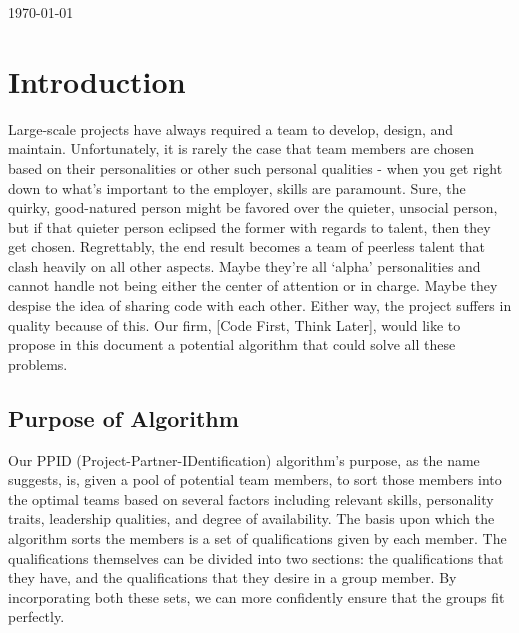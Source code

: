 \documentclass[12pt,letterpaper]{article}
\begin{document}
\vspace{2em}

\begin{center}
	\today
\end{center}

\newpage{}

\tableofcontents{}

\renewcommand{\listfigurename}{Figures}
\listoffigures

\renewcommand{\listtablename}{Tables}
\listoftables

\newpage{}

\section{Introduction}

Large-scale projects have always required a team to develop, design, and maintain. Unfortunately, it is rarely the case that team members are chosen based on their personalities or other such personal qualities - when you get right down to what's important to the employer, skills are paramount. Sure, the quirky, good-natured person might be favored over the quieter, unsocial person, but if that quieter person eclipsed the former with regards to talent, then they get chosen. Regrettably, the end result becomes a team of peerless talent that clash heavily on all other aspects. Maybe they're all `alpha' personalities and cannot handle not being either the center of attention or in charge. Maybe they despise the idea of sharing code with each other. Either way, the project suffers in quality because of this. Our firm, [Code First, Think Later], would like to propose in this document a potential algorithm that could solve all these problems.

\subsection{Purpose of Algorithm}

Our PPID (Project-Partner-IDentification) algorithm's purpose, as the name suggests, is, given a pool of potential team members, to sort those members into the optimal teams based on several factors including relevant skills, personality traits, leadership qualities, and degree of availability. The basis upon which the algorithm sorts the members is a set of qualifications given by each member. The qualifications themselves can be divided into two sections: the qualifications that they have, and the qualifications that they desire in a group member. By incorporating both these sets, we can more confidently ensure that the groups fit perfectly.
\end{document}
